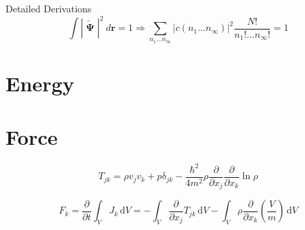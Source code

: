 \begin{chapter}{Detailed Derivations\label{app:App2}}
\begin{equation}
\int|\tilde{\bm\upPsi}|^2~d\mathbf{r}=1 \Rightarrow \sum_{n_1...n_\infty}|c(n_1...n_\infty)|^2\frac{N!}{n_1!...n_\infty!} = 1
\end{equation}

\section{\label{appsection:energy} Energy}
\section{\label{appsection:force} Force}

\begin{equation}
T_{jk} = \rho v_j v_k + p\mathrm{\delta}_{jk} - \frac{\hbar^2}{4m^2}\rho \frac{\partial}{\partial x_j}\frac{\partial}{\partial x_k} \ln \rho
\label{eq:stressTensor}
\end{equation}

\begin{equation}
F_k =\frac{\partial}{\partial t} \int_V J_k\,\mathrm{d}V = - \int_V \frac{\partial}{\partial x_j} T_{jk}\,\mathrm{d}V - \int_V \rho \frac{\partial}{\partial x_k} \left( \frac{V}{m} \right)\,\mathrm{d}V
\label{eq:force}
\end{equation}


\end{chapter}

